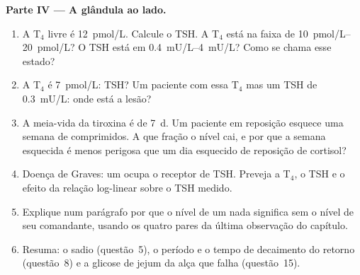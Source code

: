 \begin{problem}
\medskip
\noindent\textbf{Parte IV --- A glândula ao lado.}
\begin{enumerate}[resume]
  \item A T$_{4}$ livre é \qty{12}{pmol/L}. Calcule o TSH. A T$_{4}$ está
        na faixa de \qtyrange{10}{20}{pmol/L}? O TSH está em
        \qtyrange{0.4}{4}{mU/L}? Como se chama esse estado?
  \item A T$_{4}$ é \qty{7}{pmol/L}: TSH? Um paciente com essa T$_{4}$
        mas um TSH de \qty{0.3}{mU/L}: onde está a lesão?
  \item A meia-vida da tiroxina é de \qty{7}{d}. Um paciente em
        reposição esquece uma semana de comprimidos. A que fração o nível
        cai, e por que a semana esquecida é menos perigosa que um dia
        esquecido de reposição de cortisol?
  \item Doença de Graves: um  ocupa o receptor de TSH. Preveja a
        T$_{4}$, o TSH e o efeito da relação log-linear sobre o TSH
        medido.
  \item Explique num parágrafo por que o nível de um  nada
        significa sem o nível de seu comandante, usando os quatro pares
        da última observação do capítulo.
  \item Resuma: o  sadio (questão~5), o período e o tempo de
        decaimento do retorno (questão~8) e a glicose de jejum da alça
        que falha (questão~15).
\end{enumerate}
\end{problem}
